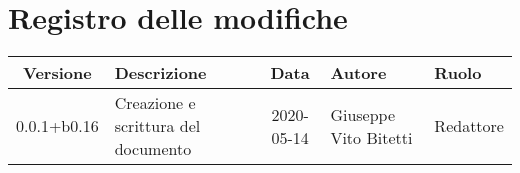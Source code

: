 \section*{Registro delle modifiche}

\begin{center}
	\begin{longtable}{|c|p{3.5cm}|c|p{3cm}|p{3cm}|}
	\hline
	\rowcolor{lighter-grayer}
	\textbf{Versione} & \textbf{Descrizione} & \textbf{Data} & \textbf{Autore} & \textbf{Ruolo} \\
	\hline
	\endfirsthead

	\hline
	0.0.1+b0.16 & Creazione e scrittura del documento & 2020-05-14 & Giuseppe Vito Bitetti & Redattore \\
	\hline

	\end{longtable}
\end{center}
